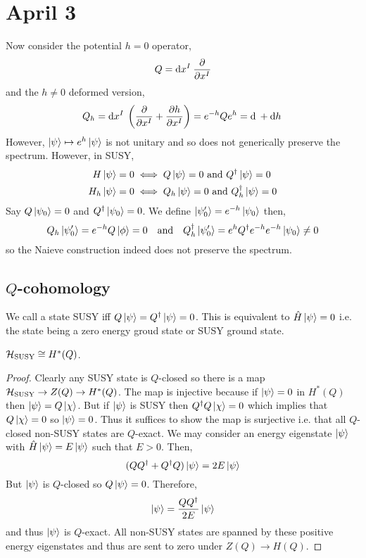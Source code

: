\documentclass[12pt]{extarticle}
\begin{document}
\section{April 3}

Now consider the potential $h = 0$ operator,
\[ Q = \mathrm{d}x^I \: \frac{\partial{}}{\partial{x^I}} \]
and the $h \neq 0$ deformed version,
\[ Q_h = \mathrm{d}x^I \: \left( \frac{\partial{}}{\partial{x^I}} + \frac{\partial{h}}{\partial{x^I}} \right) = e^{-h} Q e^h = \mathrm{d} \: + \mathrm{d}h \: \]
However, $\left| \psi \right> \mapsto e^h \left| \psi \right>$ is not unitary and so does not generically preserve the spectrum. However, in SUSY,
\begin{align*}
H \left| \psi \right> & = 0 \iff Q \left| \psi \right> = 0 \text{  and  } Q^\dagger \left| \psi \right> = 0 
\\
H_h \left| \psi \right> & = 0 \iff Q_h \left| \psi \right> = 0 \text{  and  } Q_h^\dagger \left| \psi \right> = 0
\end{align*} 
Say $Q \left| \psi_0 \right> = 0$ and $Q^\dagger \left| \psi_0 \right> = 0$. We define $\left| \psi_0' \right> = e^{-h} \left| \psi_0 \right>$ then,
\[ Q_h \left| \psi_0' \right> = e^{-h} Q \left| \phi \right> = 0 \quad \text{and} \quad Q_h^\dagger \left| \psi_0' \right> = e^h Q^\dagger e^{-h} e^{-h} \left| \psi_0 \right> \neq 0 \]
so the Naieve construction indeed does not preserve the spectrum. 

\subsection{$Q$-cohomology}

\begin{definition}
We call a state SUSY iff $Q \left| \psi \right> = Q^\dagger \left| \psi \right> = 0$. This is equivalent to $\hat{H} \left| \psi \right> = 0$ i.e. the state being a zero energy groud state or SUSY ground state.
\end{definition}

\begin{proposition}
$\mathcal{H}_{\text{SUSY}} \cong H^*(Q)$. 
\end{proposition}

\begin{proof}
Clearly any SUSY state is $Q$-closed so there is a map $\mathcal{H}_{\text{SUSY}} \to Z(Q) \to H^*(Q)$. The map is injective because if $\left| \psi \right> = 0$ in $H^*(Q)$ then $\left| \psi \right> = Q \left| \chi \right>$. But if $\left| \psi \right>$ is SUSY then $Q^\dagger Q \left| \chi \right> = 0$ which implies that $Q \left| \chi \right> = 0$ so $\left| \psi \right> = 0$. Thus it suffices to show the map is surjective i.e. that all $Q$-closed non-SUSY states are $Q$-exact. We may consider an energy eigenstate $\left| \psi \right>$ with $\hat{H} \left| \psi \right> = E \left| \psi \right>$ such that $E > 0$. Then,
\[ (Q Q^\dagger + Q^\dagger Q) \left| \psi \right> = 2 E \left| \psi \right> \]
But $\left| \psi \right>$ is $Q$-closed so $Q \left| \psi \right> = 0$.
Therefore,
\[ \left| \psi \right> = \frac{Q Q^\dagger}{2 E} \left| \psi \right> \]
and thus $\left| \psi \right>$ is $Q$-exact. All non-SUSY states are spanned by these positive energy eigenstates and thus are sent to zero under $Z(Q) \to H(Q)$.  
\end{proof}
\end{document}
